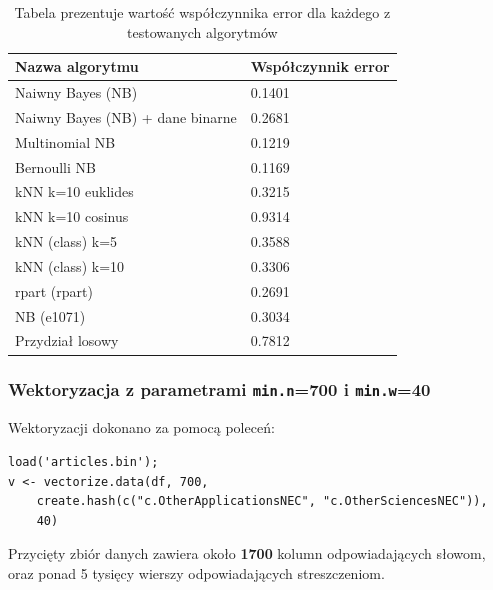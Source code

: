 \documentclass[a4paper,12pt]{article}
\begin{document}
		 \begin{table}	
		 	\centering	 	
		 	\begin{tabular}{|l|l|}
		 		\hline
		 		Nazwa algorytmu & Współczynnik error \\
		 		\hline
		 			Naiwny Bayes (NB) & 0.1401 \\
		 			Naiwny Bayes (NB) + dane binarne & 0.2681 \\
		 			Multinomial NB & 0.1219 \\
		 			Bernoulli NB & 0.1169 \\
		 			kNN k=10 euklides & 0.3215 \\
		 			kNN k=10 cosinus & 0.9314 \\
		 		\hline
		 			kNN (class) k=5 & 0.3588 \\
		 			kNN (class) k=10 & 0.3306 \\
		 			rpart (rpart) & 0.2691 \\
					NB (e1071) & 0.3034 \\	
				\hline
					Przydział losowy & 	0.7812 \\ 			
		 		\hline
		 	\end{tabular}
		 	\caption{Tabela prezentuje wartość współczynnika error dla
		 	każdego z testowanych algorytmów}
		 \end{table}
		 
		 \clearpage
		 \newpage
		 
		 \subsubsection{Wektoryzacja z parametrami \texttt{min.n}=700 i
		 \texttt{min.w}=40}
		 
		 Wektoryzacji dokonano za pomocą poleceń:
		 \begin{verbatim}
load('articles.bin');
v <- vectorize.data(df, 700, 
	create.hash(c("c.OtherApplicationsNEC", "c.OtherSciencesNEC")),
	40) 
		 \end{verbatim}
		 
		 Przycięty zbiór danych zawiera około \textbf{1700} kolumn odpowiadających
		 słowom,
		 oraz ponad 5 tysięcy wierszy odpowiadających streszczeniom.
		 
\end{document}

